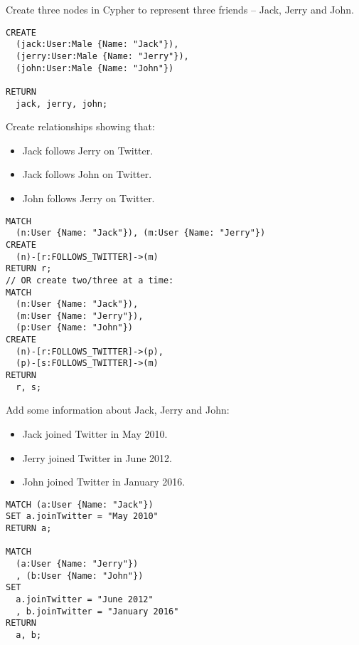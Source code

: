
\printanswers

\begin{questions}

\question
Create three nodes in Cypher to represent three friends -- Jack, Jerry and John.
\begin{solution}
  \begin{verbatim}
CREATE
  (jack:User:Male {Name: "Jack"}), 
  (jerry:User:Male {Name: "Jerry"}),
  (john:User:Male {Name: "John"})

RETURN
  jack, jerry, john;
  \end{verbatim}
\end{solution}
  
\question
Create relationships showing that:

\begin{itemize}
  \item Jack follows Jerry on Twitter.
  \item Jack follows John on Twitter.
  \item John follows Jerry on Twitter.
\end{itemize}

\begin{solution}
  \begin{verbatim}
MATCH
  (n:User {Name: "Jack"}), (m:User {Name: "Jerry"})
CREATE
  (n)-[r:FOLLOWS_TWITTER]->(m)
RETURN r;
// OR create two/three at a time:
MATCH 
  (n:User {Name: "Jack"}),
  (m:User {Name: "Jerry"}),
  (p:User {Name: "John"})
CREATE
  (n)-[r:FOLLOWS_TWITTER]->(p),
  (p)-[s:FOLLOWS_TWITTER]->(m)
RETURN
  r, s;
  \end{verbatim}
\end{solution}

\question
Add some information about Jack, Jerry and John:
\begin{itemize}
  \item Jack joined Twitter in May 2010.
  \item Jerry joined Twitter in June 2012.
  \item John joined Twitter in January 2016.
\end{itemize}

\begin{solution}
\begin{verbatim}
MATCH (a:User {Name: "Jack"})
SET a.joinTwitter = "May 2010"
RETURN a;

MATCH
  (a:User {Name: "Jerry"})
  , (b:User {Name: "John"})
SET
  a.joinTwitter = "June 2012"
  , b.joinTwitter = "January 2016"
RETURN
  a, b;
  \end{verbatim}
\end{solution}


\end{questions}
